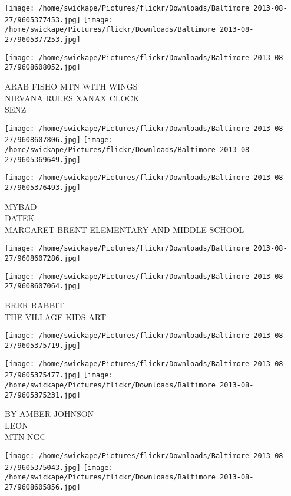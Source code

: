\documentclass[10pt,letterpaper]{article}
\begin{document}
\texttt{[image: /home/swickape/Pictures/flickr/Downloads/Baltimore 2013-08-27/9605377453.jpg]}
\texttt{[image: /home/swickape/Pictures/flickr/Downloads/Baltimore 2013-08-27/9605377253.jpg]}

\vspace{0.25in}
\texttt{[image: /home/swickape/Pictures/flickr/Downloads/Baltimore 2013-08-27/9608608052.jpg]}

ARAB FISHO MTN WITH WINGS\\
NIRVANA RULES XANAX CLOCK\\
SENZ
\pagebreak

\texttt{[image: /home/swickape/Pictures/flickr/Downloads/Baltimore 2013-08-27/9608607806.jpg]}
\texttt{[image: /home/swickape/Pictures/flickr/Downloads/Baltimore 2013-08-27/9605369649.jpg]}

\vspace{0.25in}
\texttt{[image: /home/swickape/Pictures/flickr/Downloads/Baltimore 2013-08-27/9605376493.jpg]}

MYBAD\\
DATEK\\
MARGARET BRENT ELEMENTARY AND MIDDLE SCHOOL
\pagebreak

\texttt{[image: /home/swickape/Pictures/flickr/Downloads/Baltimore 2013-08-27/9608607286.jpg]}

\vspace{0.25in}
\texttt{[image: /home/swickape/Pictures/flickr/Downloads/Baltimore 2013-08-27/9608607064.jpg]}

BRER RABBIT\\
THE VILLAGE KIDS ART
\pagebreak

\texttt{[image: /home/swickape/Pictures/flickr/Downloads/Baltimore 2013-08-27/9605375719.jpg]}

\vspace{0.25in}
\texttt{[image: /home/swickape/Pictures/flickr/Downloads/Baltimore 2013-08-27/9605375477.jpg]}
\texttt{[image: /home/swickape/Pictures/flickr/Downloads/Baltimore 2013-08-27/9605375231.jpg]}

BY AMBER JOHNSON\\
LEON\\
MTN NGC
\pagebreak

\texttt{[image: /home/swickape/Pictures/flickr/Downloads/Baltimore 2013-08-27/9605375043.jpg]}
\texttt{[image: /home/swickape/Pictures/flickr/Downloads/Baltimore 2013-08-27/9608605856.jpg]}
\end{document}
